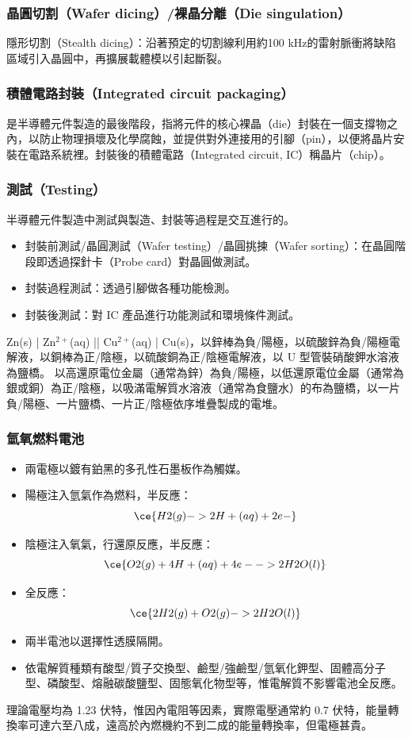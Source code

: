 \documentclass[a4paper,12pt]{report}
\begin{document}
\begin{itemize}
\begin{itemize}
\subsubsection{晶圓切割（Wafer dicing）/裸晶分離（Die singulation）}
隱形切割（Stealth dicing）：沿著預定的切割線利用約100 kHz的雷射脈衝將缺陷區域引入晶圓中，再擴展載體模以引起斷裂。
\subsubsection{積體電路封裝（Integrated circuit packaging）}
是半導體元件製造的最後階段，指將元件的核心裸晶（die）封裝在一個支撐物之內，以防止物理損壞及化學腐蝕，並提供對外連接用的引腳（pin），以便將晶片安裝在電路系統裡。封裝後的積體電路（Integrated circuit, IC）稱晶片（chip）。
\subsubsection{測試（Testing）}
半導體元件製造中測試與製造、封裝等過程是交互進行的。
\begin{itemize}
\item 封裝前測試/晶圓測試（Wafer testing）/晶圓挑揀（Wafer sorting）：在晶圓階段即透過探針卡（Probe card）對晶圓做測試。
\item 封裝過程測試：透過引腳做各種功能檢測。
\item 封裝後測試：對 IC 產品進行功能測試和環境條件測試。
\end{itemize}
Zn(s) | Zn$^{2+}$(aq) || Cu$^{2+}$(aq) | Cu(s)，以鋅棒為負/陽極，以硫酸鋅為負/陽極電解液，以銅棒為正/陰極，以硫酸銅為正/陰極電解液，以 U 型管裝硝酸鉀水溶液為鹽橋。
以高還原電位金屬（通常為鋅）為負/陽極，以低還原電位金屬（通常為銀或銅）為正/陰極，以吸滿電解質水溶液（通常為食鹽水）的布為鹽橋，以一片負/陽極、一片鹽橋、一片正/陰極依序堆疊製成的電堆。
\subsubsection{氫氧燃料電池}
\begin{itemize}
\item 兩電極以鍍有鉑黑的多孔性石墨板作為觸媒。
\item 陽極注入氫氣作為燃料，半反應：
\[\ce{H2(g) -> 2H+(aq) + 2e-}\]
\item 陰極注入氧氣，行還原反應，半反應：
\[\ce{O2(g) + 4H+(aq) + 4e- -> 2H2O(l)}\]
\item 全反應：
\[\ce{2H2(g) + O2(g) -> 2H2O(l)}\]
\item 兩半電池以選擇性透膜隔開。
\item 依電解質種類有酸型/質子交換型、鹼型/強鹼型/氫氧化鉀型、固體高分子型、磷酸型、熔融碳酸鹽型、固態氧化物型等，惟電解質不影響電池全反應。
\end{itemize}
理論電壓均為 1.23 伏特，惟因內電阻等因素，實際電壓通常約 0.7 伏特，能量轉換率可達六至八成，遠高於內燃機約不到二成的能量轉換率，但電極甚貴。

\end{itemize}
\end{itemize}
\end{document}
